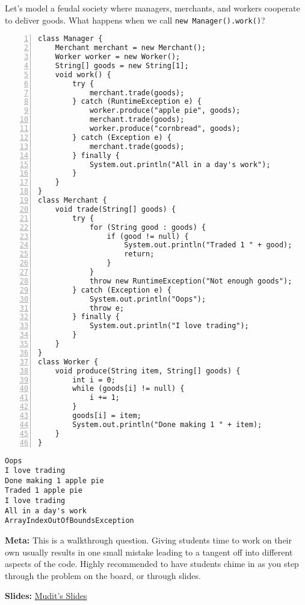 
\question Let's model a feudal society where managers, merchants, and workers
cooperate to deliver goods. What happens when we call
\lstinline$new Manager().work()$?

\begin{lstlisting}[basicstyle=\ttfamily\footnotesize,
                   numberstyle=\ttfamily\tiny, numbers=left]
class Manager {
    Merchant merchant = new Merchant();
    Worker worker = new Worker();
    String[] goods = new String[1];
    void work() {
        try {
            merchant.trade(goods);
        } catch (RuntimeException e) {
            worker.produce("apple pie", goods);
            merchant.trade(goods);
            worker.produce("cornbread", goods);
        } catch (Exception e) {
            merchant.trade(goods);
        } finally {
            System.out.println("All in a day's work");
        }
    }
}
class Merchant {
    void trade(String[] goods) {
        try {
            for (String good : goods) {
                if (good != null) {
                    System.out.println("Traded 1 " + good);
                    return;
                }
            }
            throw new RuntimeException("Not enough goods");
        } catch (Exception e) {
            System.out.println("Oops");
            throw e;
        } finally {
            System.out.println("I love trading");
        }
    }
}
class Worker {
    void produce(String item, String[] goods) {
        int i = 0;
        while (goods[i] != null) {
            i += 1;
        }
        goods[i] = item;
        System.out.println("Done making 1 " + item);
    }
}
\end{lstlisting}


\begin{solution}
\begin{verbatim}
Oops
I love trading
Done making 1 apple pie
Traded 1 apple pie
I love trading
All in a day's work
ArrayIndexOutOfBoundsException
\end{verbatim}

\textbf{Meta:} This is a walkthrough question. Giving students time to work
on their own usually results in one small mistake leading to a tangent off into
different aspects of the code. Highly recommended to have students chime in
as you step through the problem on the board, or through slides.

\textbf{Slides:}
\href{https://docs.google.com/presentation/d/1j418bduZS2Ltm6dVVg-b3WpGbOGrRUm6DKRkZCByuaQ/edit?usp=sharing}
     {Mudit's Slides}
\end{solution}
